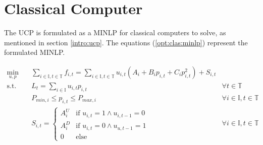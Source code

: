 \section{Classical Computer}

The UCP is formulated as a MINLP for classical computers to solve,
as mentioned in section \ref{intro:ucp}.
The equations (\ref{opt:clas:minlp}) represent the formulated MINLP.

\begin{equation}
\begin{aligned}
  \min_{u, p} \quad &
  \sum_{i \in \mathbb{I}, t \in \mathbb{T}} f_{i, t}
  = \sum_{i \in \mathbb{I}, t \in \mathbb{T}}
    u_{i, t} (A_i + B_i p_{i, t} + C_i p_{i, t}^2) + S_{i, t} \\
  \text{s.t.} \quad & L_t = \sum_{i \in \mathbb{I}} u_{i, t} p_{i, t} \quad &
  \forall t \in \mathbb{T} \\
  &
  P_{min, i} \leq p_{i, t} \leq P_{max, i} \quad &
  \forall i \in \mathbb{I}, t \in \mathbb{T} \\
  &
  S_{i, t} = \begin{cases}
    A_i^U & \text{if } u_{i, t} = 1 \land u_{i, t-1} = 0 \\
    A_i^D & \text{if } u_{i, t} = 0 \land u_{u, t-1} = 1 \\
    0 & \text{else}
  \end{cases} \quad &
  \forall i \in \mathbb{I}, t \in \mathbb{T} \\
\end{aligned}
\label{opt:clas:minlp}
\end{equation}

